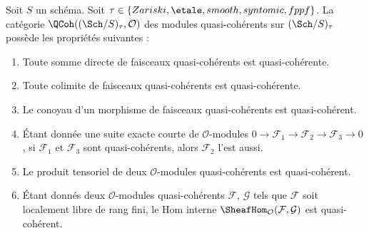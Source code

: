 \begin{lemma}
\label{lemma-properties-quasi-coherent-on-big}
Soit $S$ un schéma.
Soit $\tau \in \{Zariski, \linebreak[0] \etale, \linebreak[0]
smooth, \linebreak[0] syntomic, \linebreak[0] fppf\}$.
La catégorie $\QCoh((\Sch/S)_\tau, \mathcal{O})$ des modules
quasi-cohérents sur $(\Sch/S)_\tau$ possède les propriétés suivantes :
\begin{enumerate}
\item Toute somme directe de faisceaux quasi-cohérents est quasi-cohérente.
\item Toute colimite de faisceaux quasi-cohérents est quasi-cohérente.
\item Le conoyau d'un morphisme de faisceaux quasi-cohérents est
quasi-cohérent.
\item Étant donnée une suite exacte courte de $\mathcal{O}$-modules
$0 \to \mathcal{F}_1 \to \mathcal{F}_2 \to \mathcal{F}_3 \to 0$, si
$\mathcal{F}_1$ et $\mathcal{F}_3$ sont quasi-cohérents, alors
$\mathcal{F}_2$ l'est aussi.
\item Le produit tensoriel de deux $\mathcal{O}$-modules quasi-cohérents
est quasi-cohérent.
\item Étant donnés deux $\mathcal{O}$-modules quasi-cohérents
$\mathcal{F}$, $\mathcal{G}$ tels que $\mathcal{F}$ soit localement libre
de rang fini, le Hom interne
$\SheafHom_\mathcal{O}(\mathcal{F}, \mathcal{G})$
est quasi-cohérent.
\end{enumerate}
\end{lemma}

